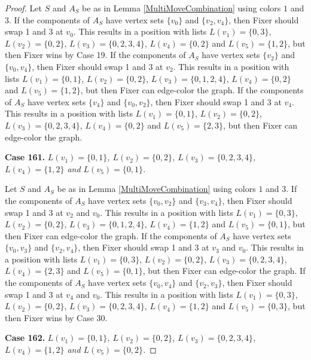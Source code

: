 \documentclass[12pt]{amsart}
\theoremstyle{plain}
\theoremstyle{definition}
\theoremstyle{remark}
\begin{document}
\begin{proof}
Let $S$ and $A_S$ be as in Lemma \ref{MultiMoveCombination} using colors $1$ and $3$. If the components of $A_S$ have vertex sets $\{v_0\}$ and $\{v_2, v_4\}$, then Fixer should swap 1 and 3 at $v_0$. This results in a position with lists $L(v_1) = \{0, 3\}$, $L(v_2) = \{0, 2\}$, $L(v_3) = \{0, 2, 3, 4\}$, $L(v_4) = \{0, 2\}$ and $L(v_5) = \{1, 2\}$, but then Fixer wins by Case 19. If the components of $A_S$ have vertex sets $\{v_2\}$ and $\{v_0, v_4\}$, then Fixer should swap 1 and 3 at $v_2$. This results in a position with lists $L(v_1) = \{0, 1\}$, $L(v_2) = \{0, 2\}$, $L(v_3) = \{0, 1, 2, 4\}$, $L(v_4) = \{0, 2\}$ and $L(v_5) = \{1, 2\}$, but then Fixer can edge-color the graph. If the components of $A_S$ have vertex sets $\{v_4\}$ and $\{v_0, v_2\}$, then Fixer should swap 1 and 3 at $v_4$. This results in a position with lists $L(v_1) = \{0, 1\}$, $L(v_2) = \{0, 2\}$, $L(v_3) = \{0, 2, 3, 4\}$, $L(v_4) = \{0, 2\}$ and $L(v_5) = \{2, 3\}$, but then Fixer can edge-color the graph. 

\noindent\textbf{Case 161.  }\textit{$L(v_1) = \{0, 1\}$, $L(v_2) = \{0, 2\}$, $L(v_3) = \{0, 2, 3, 4\}$, $L(v_4) = \{1, 2\}$ and $L(v_5) = \{0, 1\}$.}

Let $S$ and $A_S$ be as in Lemma \ref{MultiMoveCombination} using colors $1$ and $3$. If the components of $A_S$ have vertex sets $\{v_0, v_2\}$ and $\{v_3, v_4\}$, then Fixer should swap 1 and 3 at $v_2$ and $v_0$. This results in a position with lists $L(v_1) = \{0, 3\}$, $L(v_2) = \{0, 2\}$, $L(v_3) = \{0, 1, 2, 4\}$, $L(v_4) = \{1, 2\}$ and $L(v_5) = \{0, 1\}$, but then Fixer can edge-color the graph. If the components of $A_S$ have vertex sets $\{v_0, v_3\}$ and $\{v_2, v_4\}$, then Fixer should swap 1 and 3 at $v_3$ and $v_0$. This results in a position with lists $L(v_1) = \{0, 3\}$, $L(v_2) = \{0, 2\}$, $L(v_3) = \{0, 2, 3, 4\}$, $L(v_4) = \{2, 3\}$ and $L(v_5) = \{0, 1\}$, but then Fixer can edge-color the graph. If the components of $A_S$ have vertex sets $\{v_0, v_4\}$ and $\{v_2, v_3\}$, then Fixer should swap 1 and 3 at $v_4$ and $v_0$. This results in a position with lists $L(v_1) = \{0, 3\}$, $L(v_2) = \{0, 2\}$, $L(v_3) = \{0, 2, 3, 4\}$, $L(v_4) = \{1, 2\}$ and $L(v_5) = \{0, 3\}$, but then Fixer wins by Case 30. 

\noindent\textbf{Case 162.  }\textit{$L(v_1) = \{0, 1\}$, $L(v_2) = \{0, 2\}$, $L(v_3) = \{0, 2, 3, 4\}$, $L(v_4) = \{1, 2\}$ and $L(v_5) = \{0, 2\}$.}


\end{proof}
\end{document}
